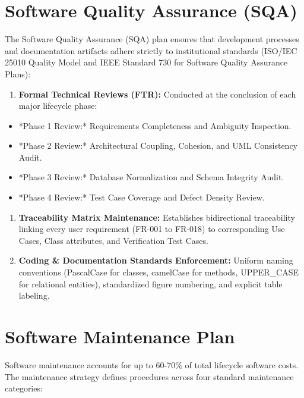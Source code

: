 \documentclass[12pt,a4paper,oneside]{report}
\begin{document}
\section{Software Quality Assurance (SQA)}

The Software Quality Assurance (SQA) plan ensures that development processes and documentation artifacts adhere strictly to institutional standards (ISO/IEC 25010 Quality Model and IEEE Standard 730 for Software Quality Assurance Plans):

\begin{enumerate}
  \item \textbf{Formal Technical Reviews (FTR):} Conducted at the conclusion of each major lifecycle phase:
\end{enumerate}

\begin{itemize}
  \item *Phase 1 Review:* Requirements Completeness and Ambiguity Inspection.
  \item *Phase 2 Review:* Architectural Coupling, Cohesion, and UML Consistency Audit.
  \item *Phase 3 Review:* Database Normalization and Schema Integrity Audit.
  \item *Phase 4 Review:* Test Case Coverage and Defect Density Review.
\end{itemize}

\begin{enumerate}
  \item \textbf{Traceability Matrix Maintenance:} Establishes bidirectional traceability linking every user requirement (FR-001 to FR-018) to corresponding Use Cases, Class attributes, and Verification Test Cases.
  \item \textbf{Coding \& Documentation Standards Enforcement:} Uniform naming conventions (PascalCase for classes, camelCase for methods, UPPER\_CASE for relational entities), standardized figure numbering, and explicit table labeling.
\end{enumerate}

\section{Software Maintenance Plan}

Software maintenance accounts for up to 60-70\% of total lifecycle software costs. The maintenance strategy defines procedures across four standard maintenance categories:
\end{document}
